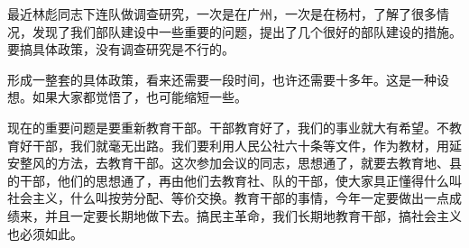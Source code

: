 最近林彪同志下连队做调查研究，一次是在广州，一次是在杨村，了解了很多情况，发现了我们部队建设中一些重要的问题，提出了几个很好的部队建设的措施。要搞具体政策，没有调查研究是不行的。

形成一整套的具体政策，看来还需要一段时间，也许还需要十多年。这是一种设想。如果大家都觉悟了，也可能缩短一些。

现在的重要问题是要重新教育干部。干部教育好了，我们的事业就大有希望。不教育好干部，我们就毫无出路。我们要利用人民公社六十条等文件，作为教材，用延安整风的方法，去教育干部。这次参加会议的同志，思想通了，就要去教育地、县的干部，他们的思想通了，再由他们去教育社、队的干部，使大家具正懂得什么叫社会主义，什么叫按劳分配、等价交换。教育干部的事情，今年一定要做出一点成绩来，并且一定要长期地做下去。搞民主革命，我们长期地教育干部，搞社会主义也必须如此。
